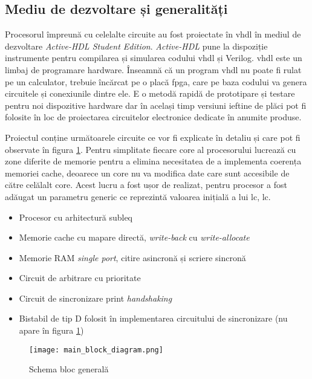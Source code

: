 \documentclass[../main.tex]{subfiles}
\begin{document}
\subsection{Mediu de dezvoltare și generalități}
Procesorul împreună cu celelalte circuite au fost proiectate în \acrshort{vhdl} în mediul de dezvoltare
\emph{Active-HDL Student Edition}. \emph{Active-HDL} pune la dispoziție instrumente pentru compilarea și
simularea codului \acrshort{vhdl} și Verilog. \acrshort{vhdl} este un limbaj de programare hardware. Înseamnă
că un program \acrshort{vhdl} nu poate fi rulat pe un calculator, trebuie încărcat pe o placă \acrshort{fpga},
care pe baza codului va genera circuitele și conexiunile dintre ele. E o metodă rapidă de prototipare și testare
pentru noi dispozitive hardware dar în același timp versiuni ieftine de plăci pot fi folosite în loc de
proiectarea circuitelor electronice dedicate în anumite produse.

Proiectul conține următoarele circuite ce vor fi explicate în detaliu și care pot fi observate în figura 
\ref{fig:main_block_diagram}. Pentru simplitate fiecare core al procesorului lucrează cu zone diferite
de memorie pentru a elimina necesitatea de a implementa coerența memoriei cache, deoarece un core nu va
modifica date care sunt accesibile de către celălalt core. Acest lucru a fost ușor de realizat, pentru
procesor a fost adăugat un parametru generic ce reprezintă valoarea inițială a lui \acrshort{lc}, \acrlong{lc}.
\begin{itemize}
    \item Procesor cu arhitectură \acrshort{subleq}
    \item Memorie cache cu mapare directă, \emph{write-back} cu \emph{write-allocate}
    \item Memorie RAM \emph{single port}, citire asincronă și scriere sincronă
    \item Circuit de arbitrare cu prioritate
    \item Circuit de sincronizare print \emph{handshaking}
    \item Bistabil de tip D folosit în implementarea circuitului de sincronizare (nu apare în figura \ref{fig:main_block_diagram})
\end{itemize}

\begin{figure}[h]
    \centering
    \texttt{[image: main\_block\_diagram.png]}
    \caption{Schema bloc generală}
    \label{fig:main_block_diagram}
\end{figure}
\end{document}
